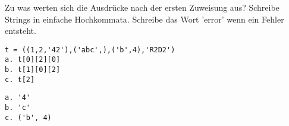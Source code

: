 \question[3]
Zu was werten sich die Ausdrücke nach der ersten Zuweisung aus? Schreibe
Strings in einfache Hochkommata. Schreibe das Wort 'error' wenn ein Fehler
entsteht.
\begin{lstlisting}
t = ((1,2,'42'),('abc',),('b',4),'R2D2')
a. t[0][2][0]
b. t[1][0][2]
c. t[2]
\end{lstlisting}
\begin{solutionbox}{5cm}
\begin{lstlisting}
a. '4'
b. 'c'
c. ('b', 4)
\end{lstlisting}
\end{solutionbox}

